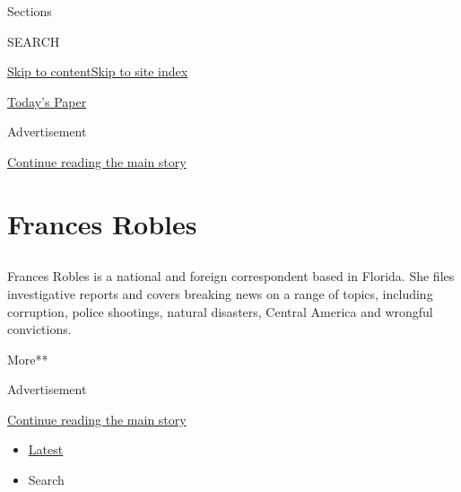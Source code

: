 Sections

SEARCH

\protect\hyperlink{site-content}{Skip to
content}\protect\hyperlink{site-index}{Skip to site index}

\href{https://myaccount.nytimes3xbfgragh.onion/auth/login?response_type=cookie\&client_id=vi}{}

\href{https://www.nytimes3xbfgragh.onion/section/todayspaper}{Today's
Paper}

Advertisement

\protect\hyperlink{after-top}{Continue reading the main story}

\hypertarget{frances-robles}{%
\section{Frances Robles}\label{frances-robles}}

\subsection{}

Frances Robles is a national and foreign correspondent based in Florida.
She files investigative reports and covers breaking news on a range of
topics, including corruption, police shootings, natural disasters,
Central America and wrongful convictions.

More**

Advertisement

\protect\hyperlink{after-mid1}{Continue reading the main story}

\begin{itemize}
\tightlist
\item
  \protect\hyperlink{stream-panel}{Latest}
\item
  Search
\end{itemize}

